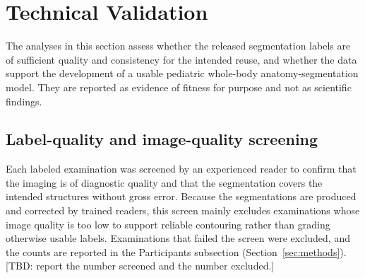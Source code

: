
\section*{Technical Validation}\label{sec:validation}

The analyses in this section assess whether the released segmentation labels are of sufficient quality and consistency for the intended reuse, and whether the data support the development of a usable pediatric whole-body anatomy-segmentation model.
They are reported as evidence of fitness for purpose and not as scientific findings.

\subsection*{Label-quality and image-quality screening}\label{subsec:qc}
Each labeled examination was screened by an experienced reader to confirm that the imaging is of diagnostic quality and that the segmentation covers the intended structures without gross error.
Because the segmentations are produced and corrected by trained readers, this screen mainly excludes examinations whose image quality is too low to support reliable contouring rather than grading otherwise usable labels.
Examinations that failed the screen were excluded, and the counts are reported in the Participants subsection (Section~\ref{sec:methods}).
[TBD: report the number screened and the number excluded.]

